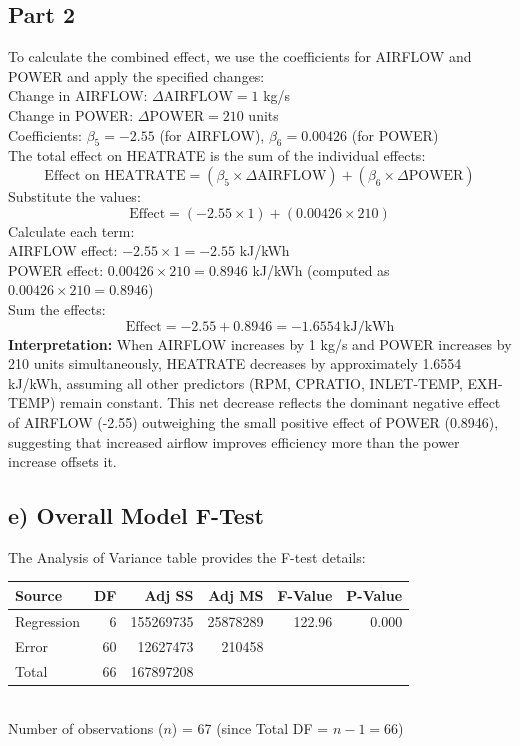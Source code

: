 \documentclass{article}
\begin{document}
\subsection*{Part 2}
To calculate the combined effect, we use the coefficients for AIRFLOW and POWER and apply the specified changes: \\
Change in AIRFLOW: \( \Delta \text{AIRFLOW} = 1 \) kg/s \\
Change in POWER: \( \Delta \text{POWER} = 210 \) units \\
Coefficients: \( \beta_5 = -2.55 \) (for AIRFLOW), \( \beta_6 = 0.00426 \) (for POWER) \\
The total effect on HEATRATE is the sum of the individual effects:
\[
\text{Effect on HEATRATE} = (\beta_5 \times \Delta \text{AIRFLOW}) + (\beta_6 \times \Delta \text{POWER})
\]
Substitute the values:
\[
\text{Effect} = (-2.55 \times 1) + (0.00426 \times 210)
\]
Calculate each term: \\
AIRFLOW effect: \( -2.55 \times 1 = -2.55 \) kJ/kWh \\
POWER effect: \( 0.00426 \times 210 = 0.8946 \) kJ/kWh (computed as \( 0.00426 \times 210 = 0.8946 \)) \\
Sum the effects:
\[
\text{Effect} = -2.55 + 0.8946 = -1.6554 \, \text{kJ/kWh}
\]
\textbf{Interpretation:} When AIRFLOW increases by 1 kg/s and POWER increases by 210 units simultaneously, HEATRATE decreases by approximately 1.6554 kJ/kWh, assuming all other predictors (RPM, CPRATIO, INLET-TEMP, EXH-TEMP) remain constant. This net decrease reflects the dominant negative effect of AIRFLOW (-2.55) outweighing the small positive effect of POWER (0.8946), suggesting that increased airflow improves efficiency more than the power increase offsets it.

\newpage












\subsection*{e) Overall Model F-Test}
The Analysis of Variance table provides the F-test details:\\
\begin{tabular}{lrrrrr}
\toprule
Source & DF & Adj SS & Adj MS & F-Value & P-Value \\
\midrule
Regression & 6 & 155269735 & 25878289 & 122.96 & 0.000 \\
Error & 60 & 12627473 & 210458 & & \\
Total & 66 & 167897208 & & & \\
\bottomrule
\end{tabular} \\
Number of observations (\( n \)) = 67 (since Total DF = \( n - 1 = 66 \))
\end{document}

